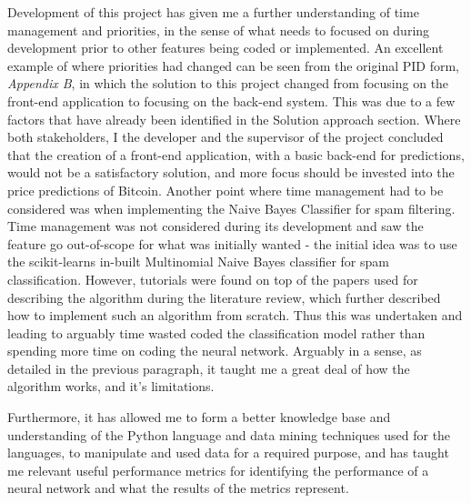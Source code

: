 \documentclass[oneside, 12pt]{article}
\begin{document}
	Development of this project has given me a further understanding of time management and priorities, in the sense of what needs to focused on during development prior to other features being coded or implemented. An excellent example of where priorities had changed can be seen from the original PID form, \textit{Appendix B}, in which the solution to this project changed from focusing on the front-end application to focusing on the back-end system. This was due to a few factors that have already been identified in the Solution approach section. Where both stakeholders, I the developer and the supervisor of the project concluded that the creation of a front-end application, with a basic back-end for predictions, would not be a satisfactory solution, and more focus should be invested into the price predictions of Bitcoin. Another point where time management had to be considered was when implementing the Naive Bayes Classifier for spam filtering. Time management was not considered during its development and saw the feature go out-of-scope for what was initially wanted - the initial idea was to use the scikit-learns in-built Multinomial Naive Bayes classifier for spam classification. However, tutorials were found on top of the papers used for describing the algorithm during the literature review, which further described how to implement such an algorithm from scratch. Thus this was undertaken and leading to arguably time wasted coded the classification model rather than spending more time on coding the neural network. Arguably in a sense, as detailed in the previous paragraph, it taught me a great deal of how the algorithm works, and it's limitations.
	
	Furthermore, it has allowed me to form a better knowledge base and understanding of the Python language and data mining techniques used for the languages, to manipulate and used data for a required purpose, and has taught me relevant useful performance metrics for identifying the performance of a neural network and what the results of the metrics represent.
	
\end{document}
